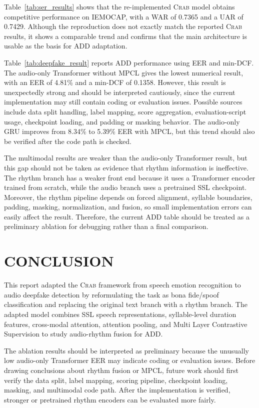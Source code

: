 \documentclass[12pt, a4paper, twocolumn]{article}
\newcommand{\crab}{\textsc{Crab}}
\begin{document}
Table~\ref{tab:ser_results} shows that the re-implemented \crab{} model obtains
competitive performance on IEMOCAP, with a WAR of 0.7365 and a UAR of 0.7429.
Although the reproduction does not exactly match the reported \crab{} results,
it shows a comparable trend and confirms that the main architecture is usable as
the basis for ADD adaptation.

Table~\ref{tab:deepfake_result} reports ADD performance using EER and min-DCF.
The audio-only Transformer without MPCL gives the lowest numerical result, with
an EER of 4.81\% and a min-DCF of 0.1358. However, this result is unexpectedly
strong and should be interpreted cautiously, since the current implementation may
still contain coding or evaluation issues. Possible sources include data split
handling, label mapping, score aggregation, evaluation-script usage,
checkpoint loading, and padding or masking behavior. The audio-only GRU improves
from 8.34\% to 5.39\% EER with MPCL, but this trend should also be verified
after the code path is checked.

The multimodal results are weaker than the audio-only Transformer result, but
this gap should not be taken as evidence that rhythm information is ineffective.
The rhythm branch has a weaker front end because it uses a Transformer encoder
trained from scratch, while the audio branch uses a pretrained SSL checkpoint.
Moreover, the rhythm pipeline depends on forced alignment, syllable boundaries,
padding, masking, normalization, and fusion, so small implementation errors can
easily affect the result. Therefore, the current ADD table should be treated as a
preliminary ablation for debugging rather than a final comparison.

\section{CONCLUSION}
This report adapted the \crab{} framework from speech emotion recognition to
audio deepfake detection by reformulating the task as bona fide/spoof
classification and replacing the original text branch with a rhythm branch. The
adapted model combines SSL speech representations, syllable-level duration
features, cross-modal attention, attention pooling, and Multi Layer Contrastive
Supervision to study audio-rhythm fusion for ADD.

The ablation results should be interpreted as preliminary because the unusually
low audio-only Transformer EER may indicate coding or evaluation issues. Before
drawing conclusions about rhythm fusion or MPCL, future work should first verify
the data split, label mapping, scoring pipeline, checkpoint loading, masking, and
multimodal code path. After the implementation is verified, stronger or
pretrained rhythm encoders can be evaluated more fairly.



\end{document}
